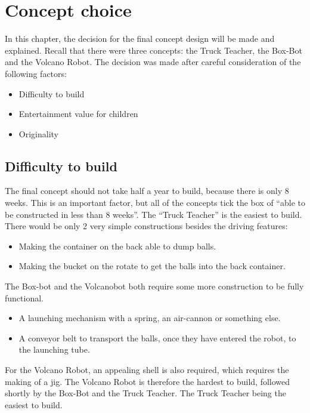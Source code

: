 \documentclass[11pt,twoside,a4paper]{report}
\begin{document}
\chapter{Concept choice}
In this chapter, the decision for the final concept design will be made and explained. Recall that there were three concepts: the Truck Teacher, the Box-Bot and the Volcano Robot. The decision was made after careful consideration of the following factors:
\begin{itemize}
\item Difficulty to build
\item Entertainment value for children
\item Originality
\end{itemize}
\section{Difficulty to build}
The final concept should not take half a year to build, because there is only 8 weeks. This is an important factor, but all of the concepts tick the box of “able to be constructed in less than 8 weeks”. The “Truck Teacher” is the easiest to build. There would be only 2 very simple constructions besides the driving features:
\begin{itemize}
\item Making the container on the back able to dump balls.
\item Making the bucket on the rotate to get the balls into the back container.
\end{itemize}
The Box-bot and the Volcanobot both require some more construction to be fully functional.
\begin{itemize}
\item A launching mechanism with a spring, an air-cannon or something else.
\item A conveyor belt to transport the balls, once they have entered the robot, to the launching tube.
\end{itemize}
For the Volcano Robot, an appealing shell is also required, which requires the making of a jig. The Volcano Robot is therefore the hardest to build, followed shortly by the Box-Bot and the Truck Teacher. The Truck Teacher being the easiest to build.
\end{document}
